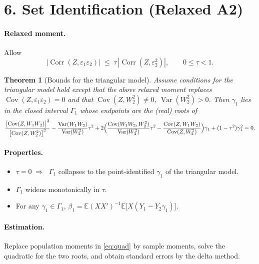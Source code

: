 \documentclass{article}
\newcommand{\E}{\mathbb{E}}
\newcommand{\cov}{\operatorname{Cov}}
\newcommand{\corr}{\operatorname{Corr}}
\newcommand{\var}{\operatorname{Var}}
\theoremstyle{plain}
\newtheorem{theorem}{Theorem}
\begin{document}
\section*{6. Set Identification (Relaxed A2)}

\paragraph{Relaxed moment.}
Allow
\[
|\corr(Z,\varepsilon_1\varepsilon_2)|
  \;\le\;
  \tau\,|\corr(Z,\varepsilon_2^{2})|,
  \qquad 0\le\tau<1.
\]

\begin{theorem}[Bounds for the triangular model]
\label{thm:bounds}
Assume conditions for the triangular model hold except that the above relaxed moment
replaces $\cov(Z,\varepsilon_1\varepsilon_2)=0$ and that
$\cov(Z,W_2^{2})\neq0$, $\var(W_2^{2})>0$.
Then $\gamma_1$ lies in the closed interval $\Gamma_1$ whose endpoints are the
(real) roots of
\begin{align}\label{eq:quad}
\frac{\bigl[\cov(Z,W_1W_2)\bigr]^{2}}{\bigl[\cov(Z,W_2^{2})\bigr]^{2}}
-\frac{\var(W_1W_2)}{\var(W_2^{2})}\tau^{2}
+2\Bigl(\frac{\cov(W_1W_2,W_2^{2})}{\var(W_2^{2})}\tau^{2}
      -\frac{\cov(Z,W_1W_2)}{\cov(Z,W_2^{2})}\Bigr)\gamma_1
+(1-\tau^{2})\gamma_1^{2}=0.
\end{align}
\end{theorem}

\paragraph{Properties.}
\begin{itemize}\itemsep0pt
\item $\tau=0\;\Rightarrow\;$ $\Gamma_1$ collapses to the
      point‑identified $\gamma_1$ of the triangular model.
\item $\Gamma_1$ widens monotonically in $\tau$.
\item For any $\gamma_1\in\Gamma_1$,
      $\beta_1=\E(XX')^{-1}\E\!\bigl[X(Y_1-Y_2\gamma_1)\bigr]$.
\end{itemize}

\paragraph{Estimation.}
Replace population moments in \eqref{eq:quad} by sample moments,
solve the quadratic for the two roots, and obtain standard errors by the
delta method.
\end{document}
